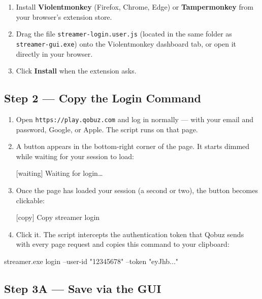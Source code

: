 \documentclass[11pt,a4paper]{article}
\begin{document}
\begin{enumerate}
  \item Install \textbf{Violentmonkey} (Firefox, Chrome, Edge) or
        \textbf{Tampermonkey} from your browser's extension store.
  \item Drag the file \texttt{streamer-login.user.js} (located in the same
        folder as \texttt{streamer-gui.exe}) onto the Violentmonkey dashboard
        tab, or open it directly in your browser.
  \item Click \textbf{Install} when the extension asks.
\end{enumerate}

\subsection{Step 2 --- Copy the Login Command}

\begin{enumerate}
  \item Open \texttt{https://play.qobuz.com} and log in normally --- with your
        email and password, Google, or Apple.  The script runs on that page.
  \item A button appears in the bottom-right corner of the page. It starts
        dimmed while waiting for your session to load:

        \medskip
        {\ttfamily\small\color{accent} [waiting] Waiting for login\ldots}
        \medskip

  \item Once the page has loaded your session (a second or two), the button
        becomes clickable:

        \medskip
        {\ttfamily\small\color{accent} [copy] Copy streamer login}
        \medskip

  \item Click it.  The script intercepts the authentication token that Qobuz
        sends with every page request and copies this command to your clipboard:
\end{enumerate}

\begin{cmdbox}
streamer.exe login --user-id "12345678" --token "eyJhb..."
\end{cmdbox}

\subsection{Step 3A --- Save via the GUI}
\end{document}
